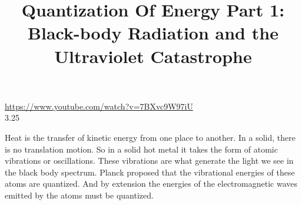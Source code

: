 \documentclass{../template/texnote}
\title{Quantization Of Energy Part 1: Black-body Radiation and the Ultraviolet Catastrophe}
\begin{document}
    \maketitle {}
\url{https://www.youtube.com/watch?v=7BXvc9W97iU}
\\

3.25

Heat is the transfer of kinetic energy from one place to another.
In a solid, there is no translation motion.
So in a solid hot metal it takes the form of atomic vibrations or oscillations.
These vibrations are what generate the light we see in the black body spectrum.
Planck proposed that the vibrational energies of these atoms are quantized.
And by extension the energies of the electromagnetic waves emitted by the atoms must be quantized.
    \printbibliography
\end{document}
